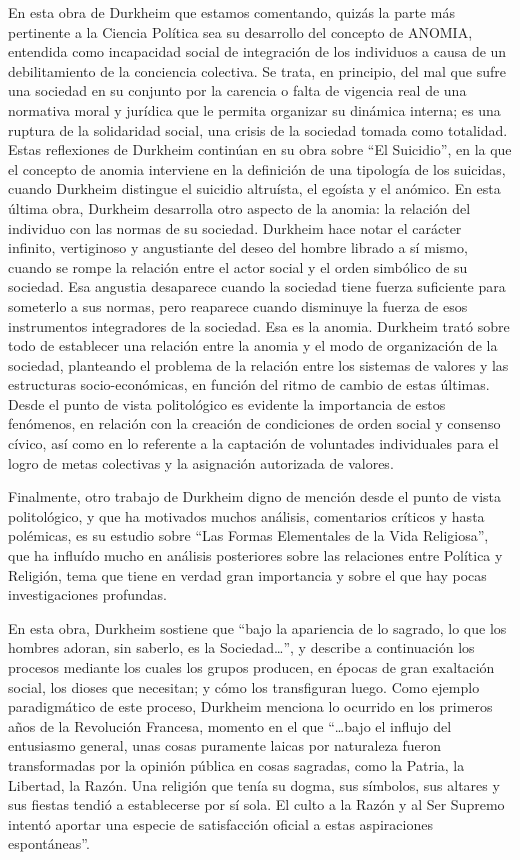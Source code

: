 \documentclass[
]{book}
\begin{document}
En esta obra de Durkheim que estamos comentando, quizás la parte más pertinente a la Ciencia Política sea su desarrollo del concepto de ANOMIA, entendida como incapacidad social de integración de los individuos a causa de un debilitamiento de la conciencia colectiva. Se trata, en principio, del mal que sufre una sociedad en su conjunto por la carencia o falta de vigencia real de una normativa moral y jurídica que le permita organizar su dinámica interna; es una ruptura de la solidaridad social, una crisis de la sociedad tomada como totalidad. Estas reflexiones de Durkheim continúan en su obra sobre ``El Suicidio'', en la que el concepto de anomia interviene en la definición de una tipología de los suicidas, cuando Durkheim distingue el suicidio altruísta, el egoísta y el anómico. En esta última obra, Durkheim desarrolla otro aspecto de la anomia: la relación del individuo con las normas de su sociedad. Durkheim hace notar el carácter infinito, vertiginoso y angustiante del deseo del hombre librado a sí mismo, cuando se rompe la relación entre el actor social y el orden simbólico de su sociedad. Esa angustia desaparece cuando la sociedad tiene fuerza suficiente para someterlo a sus normas, pero reaparece cuando disminuye la fuerza de esos instrumentos integradores de la sociedad. Esa es la anomia. Durkheim trató sobre todo de establecer una relación entre la anomia y el modo de organización de la sociedad, planteando el problema de la relación entre los sistemas de valores y las estructuras socio-económicas, en función del ritmo de cambio de estas últimas. Desde el punto de vista politológico es evidente la importancia de estos fenómenos, en relación con la creación de condiciones de orden social y consenso cívico, así como en lo referente a la captación de voluntades individuales para el logro de metas colectivas y la asignación autorizada de valores.

Finalmente, otro trabajo de Durkheim digno de mención desde el punto de vista politológico, y que ha motivados muchos análisis, comentarios críticos y hasta polémicas, es su estudio sobre ``Las Formas Elementales de la Vida Religiosa'', que ha influído mucho en análisis posteriores sobre las relaciones entre Política y Religión, tema que tiene en verdad gran importancia y sobre el que hay pocas investigaciones profundas.

En esta obra, Durkheim sostiene que ``bajo la apariencia de lo sagrado, lo que los hombres adoran, sin saberlo, es la Sociedad\ldots{}'', y describe a continuación los procesos mediante los cuales los grupos producen, en épocas de gran exaltación social, los dioses que necesitan; y cómo los transfiguran luego. Como ejemplo paradigmático de este proceso, Durkheim menciona lo ocurrido en los primeros años de la Revolución Francesa, momento en el que ``\ldots bajo el influjo del entusiasmo general, unas cosas puramente laicas por naturaleza fueron transformadas por la opinión pública en cosas sagradas, como la Patria, la Libertad, la Razón. Una religión que tenía su dogma, sus símbolos, sus altares y sus fiestas tendió a establecerse por sí sola. El culto a la Razón y al Ser Supremo intentó aportar una especie de satisfacción oficial a estas aspiraciones espontáneas''.
\end{document}
